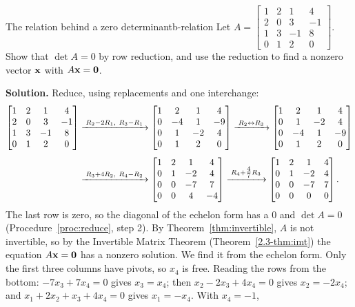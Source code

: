 \documentclass[11pt]{article}
\begin{document}
\begin{exmp}{The relation behind a zero determinant}{b-relation}
Let $A=\begin{bmatrix}1&2&1&4\\2&0&3&-1\\1&3&-1&8\\0&1&2&0\end{bmatrix}$. Show that $\det A=0$ by row reduction, and use the reduction to find a nonzero vector $\mathbf{x}$ with $A\mathbf{x}=\mathbf{0}$.

\textbf{Solution.} Reduce, using replacements and one interchange:
\begin{align*}
\begin{bmatrix}1&2&1&4\\2&0&3&-1\\1&3&-1&8\\0&1&2&0\end{bmatrix}
&\xrightarrow{\;R_2-2R_1,\ R_3-R_1\;}
\begin{bmatrix}1&2&1&4\\0&-4&1&-9\\0&1&-2&4\\0&1&2&0\end{bmatrix}
\xrightarrow{\;R_2\leftrightarrow R_3\;}
\begin{bmatrix}1&2&1&4\\0&1&-2&4\\0&-4&1&-9\\0&1&2&0\end{bmatrix}
\\[4pt]
&\xrightarrow{\;R_3+4R_2,\ R_4-R_2\;}
\begin{bmatrix}1&2&1&4\\0&1&-2&4\\0&0&-7&7\\0&0&4&-4\end{bmatrix}
\xrightarrow{\;R_4+\tfrac47R_3\;}
\begin{bmatrix}1&2&1&4\\0&1&-2&4\\0&0&-7&7\\0&0&0&0\end{bmatrix}
.
\end{align*}
The last row is zero, so the diagonal of the echelon form has a $0$ and $\det A=0$ (Procedure~\ref{proc:reduce}, step 2). By Theorem~\ref{thm:invertible}, $A$ is not invertible, so by the Invertible Matrix Theorem (Theorem~\ref{2.3-thm:imt}) the equation $A\mathbf{x}=\mathbf{0}$ has a nonzero solution. We find it from the echelon form. Only the first three columns have pivots, so $x_4$ is free. Reading the rows from the bottom: $-7x_3+7x_4=0$ gives $x_3=x_4$; then $x_2-2x_3+4x_4=0$ gives $x_2=-2x_4$; and $x_1+2x_2+x_3+4x_4=0$ gives $x_1=-x_4$. With $x_4=-1$,

\end{exmp}
\end{document}
